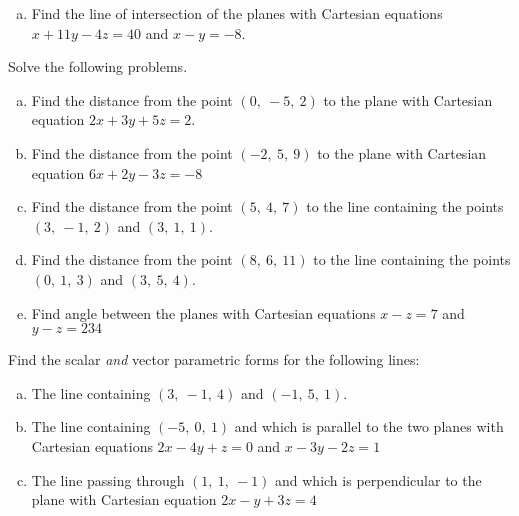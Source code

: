 \begin{prob}
\begin{enumerate}[a)]
\item\sov Find the line of intersection of the planes with Cartesian equations $x+11y-4z=40$ and $x -y=-8$. \medskip

\end{enumerate}



\end{prob} \begin{prob} \label{prob03.4}  Solve the following problems. \medskip
\begin{enumerate}[a)]

\item  Find the distance from the point $(0,\ -5,\ 2)$ to the plane with Cartesian equation
$2x+3y+5z=2$. \medskip

\item\sov  Find the distance from the point $(-2,\ 5,\ 9)$ to the plane with Cartesian equation
$6x+2y-3z=-8$  \medskip
\item Find the distance from the point $(5,\ 4,\ 7)$ to the
line containing the points $(3,\ -1,\ 2)$ and $(3,\ 1,\ 1)$.
\medskip
%



\item\sov  Find the distance from the point $(8,\ 6,\ 11)$ to the
line containing the points $(0,\ 1,\ 3)$ and $(3,\ 5,\ 4)$.  \medskip
 
\item Find angle between the planes with Cartesian equations $x-z=7$ and $y-z=234$
\medskip




\end{enumerate}



\end{prob} \begin{prob} \label{prob03.5}  Find the scalar {\it and} vector parametric forms for  the following lines:
\medskip
\begin{enumerate}[a)]

\item The line containing $(3,\ -1,\ 4)$  and $(-1,\ 5,\ 1)$. \medskip
% 
\item\sov The line containing $(-5,\ 0,\ 1)$ and which is parallel to the two planes with Cartesian equations $2x-4y+z=0$ and  $x-3y-2z=1$ 
\medskip
\item The line passing through  $(1,\ 1,\ -1)$ and which is perpendicular to the plane with Cartesian equation $2x-y+3z=4$ \medskip
\end{enumerate}


\end{prob}

